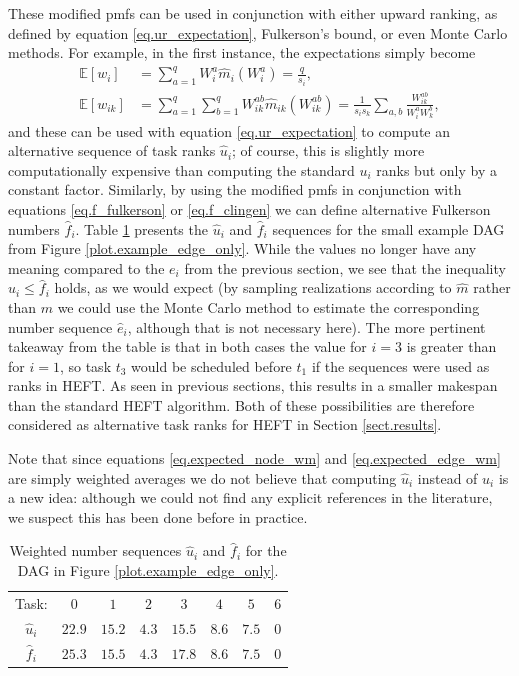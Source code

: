 \documentclass[12pt]{article}
\def\E{\mathbb{E}}
\begin{document}
These modified pmfs can be used in conjunction with either upward ranking, as defined by equation \eqref{eq.ur_expectation}, Fulkerson's bound, or even Monte Carlo methods. For example, in the first instance, the expectations simply become 
\begin{align}
\E[w_i] &= \sum_{a = 1}^{q} W_i^a \hat{m}_i(W_i^a) = \frac{q}{s_i}, \label{eq.expected_node_wm}\\
\E[w_{ik}] &= \sum_{a = 1}^{q} \sum_{b = 1}^{q}  W_{ik}^{ab} \hat{m}_{ik}(W_{ik}^{ab}) = \frac{1}{s_i s_k} \sum_{a, b} \frac{W_{ik}^{ab}}{W_i^a W_k^b} \label{eq.expected_edge_wm},
\end{align}
and these can be used with equation \eqref{eq.ur_expectation} to compute an alternative sequence of task ranks $\hat{u}_i$; of course, this is slightly more computationally expensive than computing the standard $u_i$ ranks but only by a constant factor. Similarly, by using the modified pmfs in conjunction with equations \eqref{eq.f_fulkerson} or \eqref{eq.f_clingen} we can define alternative Fulkerson numbers $\hat{f}_i$. Table \ref{tb.weighted_example} presents the $\hat{u}_i$ and $\hat{f}_i$ sequences for the small example DAG from Figure \ref{plot.example_edge_only}. While the values no longer have any meaning compared to the $e_i$ from the previous section, we see that the inequality $\hat{u}_i \leq \hat{f}_i$ holds, as we would expect (by sampling realizations according to $\hat{m}$ rather than $m$ we could use the Monte Carlo method to estimate the corresponding number sequence $\hat{e}_i$, although that is not necessary here). The more pertinent takeaway from the table is that in both cases the value for $i = 3$ is greater than for $i = 1$, so task $t_3$ would be scheduled before $t_1$ if the sequences were used as ranks in HEFT. As seen in previous sections, this results in a smaller makespan than the standard HEFT algorithm. Both of these possibilities are therefore considered as alternative task ranks for HEFT in Section \ref{sect.results}. 

Note that since equations \eqref{eq.expected_node_wm} and \eqref{eq.expected_edge_wm} are simply weighted averages we do not believe that computing $\hat{u}_i$ instead of $u_i$ is a new idea: although we could not find any explicit references in the literature, we suspect this has been done before in practice. 

\begin{table}
	\caption{Weighted number sequences $\hat{u}_i$ and $\hat{f}_i$ for the DAG in Figure \ref{plot.example_edge_only}.} 
	\begin{center}	
		\begin{tabular}{c c c c c c c c}
			\cmidrule{1-8}
			Task: & $0$ & $1$ & $2$ & $3$ & $4$ & $5$ & $6$\\
			\cmidrule{1-8}
			$\hat{u}_i$ & $22.9$ & $15.2$ & $4.3$ & $15.5$ & $8.6$ & $7.5$ & $0$\\
			$\hat{f}_i$ & $25.3$ & $15.5$ & $4.3$ & $17.8$ & $8.6$ & $7.5$ & $0$ \\
			\bottomrule
		\end{tabular}
		\label{tb.weighted_example}
	\end{center}	
\end{table} 
\end{document}
